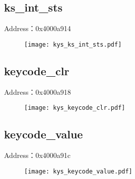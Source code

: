 \subsection{ks\_int\_sts}
\label{kys-ks-int-sts}
Address：0x4000a914
 \begin{figure}[H]
\texttt{[image: kys\_ks\_int\_sts.pdf]}
\end{figure}

\subsection{keycode\_clr}
\label{kys-keycode-clr}
Address：0x4000a918
 \begin{figure}[H]
\texttt{[image: kys\_keycode\_clr.pdf]}
\end{figure}

\subsection{keycode\_value}
\label{kys-keycode-value}
Address：0x4000a91c
 \begin{figure}[H]
\texttt{[image: kys\_keycode\_value.pdf]}
\end{figure}

